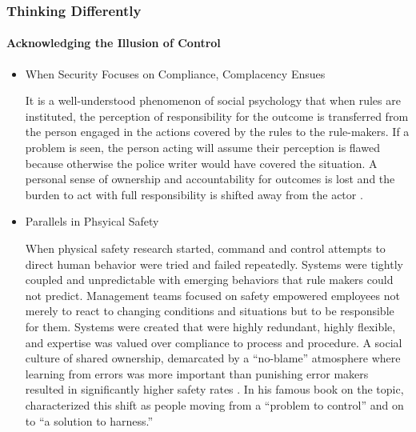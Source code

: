\begin{frame}
  \frametitle{Thinking Differently}
  \framesubtitle{Acknowledging the Illusion of Control}
  \begin{itemize}
    \item<1-> When Security Focuses on Compliance, Complacency Ensues

           {\scriptsize{It is a well-understood phenomenon of social psychology that when rules are instituted, the perception of responsibility for the outcome is transferred from the person engaged in the actions covered by the rules to the rule-makers. If a problem is seen, the person acting will assume their perception is flawed because otherwise the police writer would have covered the situation. A personal sense of ownership and accountability for outcomes is lost and the burden to act with full responsibility is shifted away from the actor \parencite{phamInformationSecurityPeople2017}.}}

    \item<2-> Parallels in Phsyical Safety

           {\scriptsize{When physical safety research started, command and control attempts to direct human behavior were tried and failed repeatedly. Systems were tightly coupled and unpredictable with emerging behaviors that rule makers could not predict. Management teams focused on safety empowered employees not merely to react to changing conditions and situations but to be responsible for them. Systems were created that were highly redundant, highly flexible, and expertise was valued over compliance to process and procedure. A social culture of shared ownership, demarcated by a ``no-blame'' atmosphere where learning from errors was more important than punishing error makers resulted in significantly higher safety rates \parencite{zimmermannMovingHumanasproblemHumanassolution2019}. In his famous book on the topic, \textcite{dekkerSafetyDifferentlyHuman2014} characterized this shift as people moving from a ``problem to control'' and on to ``a solution to harness.''}}

  \end{itemize}
\end{frame}
